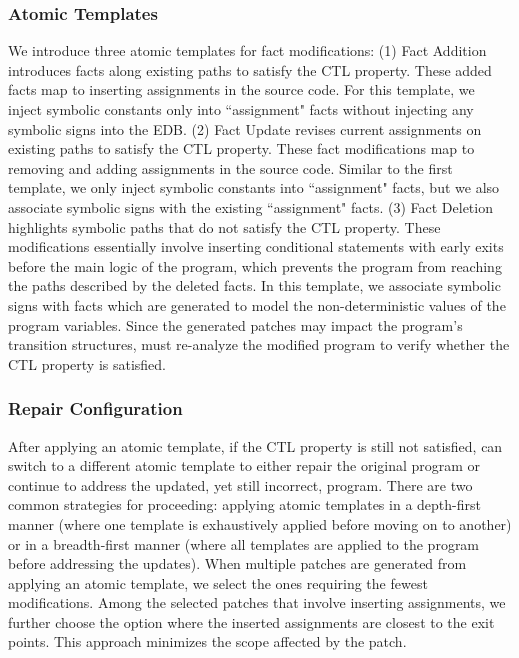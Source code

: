 \subsubsection{Atomic Templates}
We introduce three atomic templates for fact modifications:  
(1) {Fact Addition} introduces facts along existing paths to satisfy the CTL property.
These added facts map to inserting assignments in the source code.
For this template, we inject symbolic constants only into ``assignment" facts without injecting any symbolic signs into the EDB.
(2) {Fact Update} revises current assignments on existing paths to satisfy the CTL property.
These fact modifications map to removing and adding assignments in the source code.
Similar to the first template, we only inject symbolic constants into ``assignment" facts, but we also associate symbolic signs with the existing ``assignment" facts.
(3) {Fact Deletion} highlights symbolic paths that do not satisfy the CTL property. These modifications essentially involve inserting conditional statements with early exits before the main logic of the program, which prevents the program from reaching the paths described by the deleted facts. 
In this template, we associate symbolic signs with facts which are generated to model the non-deterministic values of the program variables. Since the generated patches may impact the program's transition structures, \toolName must re-analyze the modified program to verify whether the CTL property is satisfied. 

\subsubsection{Repair Configuration}
After applying an atomic template, if the CTL property is still not satisfied, \toolName can switch to a different atomic template to either repair the original program or continue to address the updated, yet still incorrect, program. 
There are two common strategies for proceeding: applying atomic templates in a depth-first manner (where one template is exhaustively applied before moving on to another) or in a breadth-first manner (where all templates are applied to the program before addressing the updates). 
When multiple patches are generated from applying an atomic template, we select the ones requiring the fewest modifications. Among the selected patches that involve inserting assignments, we further choose the option where the inserted assignments are closest to the exit points. This approach minimizes the scope affected by the patch. 
